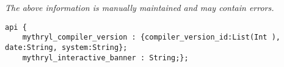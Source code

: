 \label{pkg:mythryl\_compiler\_version}

{\tiny \it The above information is manually maintained and may contain errors.}
\begin{verbatim}
api {
    mythryl_compiler_version : {compiler_version_id:List(Int ), date:String, system:String};
    mythryl_interactive_banner : String;};
\end{verbatim}
